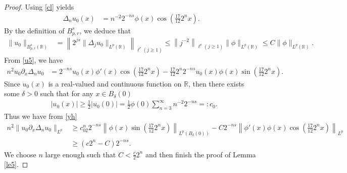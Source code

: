 \documentclass[10pt,a4paper]{amsart}
\newcommand{\De}{\Delta}
\newcommand{\R}{\mathbb{R}}
\newcommand{\f}{\left}
\newcommand{\fr}{\frac}
\newcommand{\g}{\right}
\newcommand{\pa}{\partial}
\begin{document}
\begin{proof}\;
Using \eqref{cl} yields
\begin{align}\label{u5}
\De_{n}u_0(x)&=n^{-2}2^{-ns} \phi(x)\cos \f(\frac{17}{12}2^{n}x\g).
\end{align}
By the definition of ${B}_{p,r}^{s}$, we deduce that
\begin{align*}
 \|u_{0}\|_{{B}_{p,r}^{s}(\R)}&=\f\|2^{js}\|\Delta_{j}u_0\|_{L^p(\R)}\g\|_{\ell^r(j\geq1)}
\leq \f\|j^{-2}\g\|_{\ell^r(j\geq1)} \|\phi\|_{L^{p}(\R)}\leq C\|\phi\|_{L^{p}(\R)}.
\end{align*}
From \eqref{u5}, we have
\begin{align*}
n^2u_0\pa_x\De_{n}u_0&=2^{-ns} u_0(x)\phi'(x)\cos \f(\frac{17}{12}2^{n}x\g)-\frac{17}{12}2^{n}2^{-ns} u_0(x)\phi(x)\sin \f(\frac{17}{12}2^{n}x\g).
\end{align*}
Since $u_0(x)$ is a real-valued and continuous function on $\R$, then there exists some $\delta>0$ such that for any $x\in B_{\delta}(0)$
\begin{align}\label{yh}
&|u_0(x)|\geq \fr{1}{2}|u_0(0)|=\fr{1}{2}\phi(0)\sum\limits^{\infty}_{n=3}n^{-2}2^{-ns}=:c_0.
\end{align}
Thus we have from \eqref{yh}
\begin{align*}
n^2\|u_0\pa_x\De_{n}u_0\|_{L^p}
&\geq c_02^{n}2^{-ns} \f\|\phi(x)\sin \f(\frac{17}{12}2^{n}x\g)\g\|_{L^p(B_{\delta}(0))}-C2^{-ns}\f\| \phi'(x)\phi(x)\cos \f(\frac{17}{12}2^{n}x\g)\g\|_{L^p}\\
&\geq (c2^{n}-C)2^{-ns} .
\end{align*}
We choose $n$ large enough such that $C<\frac{c}{2}2^{n}$ and then finish the proof of Lemma \ref{le5}.
\end{proof}
\end{document}
